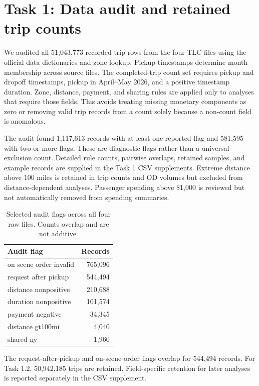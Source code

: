 \section{Task 1: Data audit and retained trip counts}
\label{sec:task1}
We audited all 51,043,773 recorded trip rows from the four TLC files using the official data dictionaries and zone lookup. Pickup timestamps determine month membership across source files. The completed-trip count set requires pickup and dropoff timestamps, pickup in April--May 2026, and a positive timestamp duration. Zone, distance, payment, and sharing rules are applied only to analyses that require those fields. This avoids treating missing monetary components as zero or removing valid trip records from a count solely because a non-count field is anomalous.

The audit found 1,117,613 records with at least one reported flag and 581,595 with two or more flags. These are diagnostic flags rather than a universal exclusion count. Detailed rule counts, pairwise overlaps, retained samples, and example records are supplied in the Task 1 CSV supplements. Extreme distance above 100 miles is retained in trip counts and OD volumes but excluded from distance-dependent analyses. Passenger spending above \$1,000 is reviewed but not automatically removed from spending summaries.

\begin{table}[htbp]
\centering\small
\caption{Selected audit flags across all four raw files. Counts overlap and are not additive.}
\begin{tabular}{lr}
\hline
Audit flag & Records \\
\hline
on scene order invalid & 765,096 \\
request after pickup & 544,494 \\
distance nonpositive & 210,688 \\
duration nonpositive & 101,574 \\
payment negative & 34,345 \\
distance gt100mi & 4,040 \\
shared ny & 1,960 \\
\hline
\end{tabular}
\end{table}

The request-after-pickup and on-scene-order flags overlap for 544,494 records. For Task 1.2, 50,942,185 trips are retained. Field-specific retention for later analyses is reported separately in the CSV supplement.

